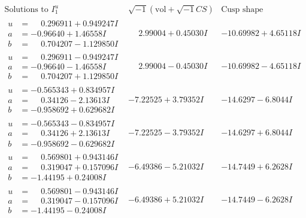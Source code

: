 \documentclass[1p]{elsarticle_modified}
\theoremstyle{definition}
\newcommand{\I}{\sqrt{-1}}
\begin{document}
$$\begin{array}{c|c|c}  
\text{Solutions to }I^u_{1}& \I (\text{vol} + \sqrt{-1}CS) & \text{Cusp shape}\\
 \hline 
\begin{aligned}
u &= \phantom{-}0.296911 + 0.949247 I \\
a &= -0.96640 + 1.46558 I \\
b &= \phantom{-}0.704207 - 1.129850 I\end{aligned}
 & \phantom{-}2.99004 + 0.45030 I & -10.69982 + 4.65118 I \\ \hline\begin{aligned}
u &= \phantom{-}0.296911 - 0.949247 I \\
a &= -0.96640 - 1.46558 I \\
b &= \phantom{-}0.704207 + 1.129850 I\end{aligned}
 & \phantom{-}2.99004 - 0.45030 I & -10.69982 - 4.65118 I \\ \hline\begin{aligned}
u &= -0.565343 + 0.834957 I \\
a &= \phantom{-}0.34126 - 2.13613 I \\
b &= -0.958692 + 0.629682 I\end{aligned}
 & -7.22525 + 3.79352 I & -14.6297 - 6.8044 I \\ \hline\begin{aligned}
u &= -0.565343 - 0.834957 I \\
a &= \phantom{-}0.34126 + 2.13613 I \\
b &= -0.958692 - 0.629682 I\end{aligned}
 & -7.22525 - 3.79352 I & -14.6297 + 6.8044 I \\ \hline\begin{aligned}
u &= \phantom{-}0.569801 + 0.943146 I \\
a &= \phantom{-}0.319047 + 0.157096 I \\
b &= -1.44195 + 0.24008 I\end{aligned}
 & -6.49386 - 5.21032 I & -14.7449 + 6.2628 I \\ \hline\begin{aligned}
u &= \phantom{-}0.569801 - 0.943146 I \\
a &= \phantom{-}0.319047 - 0.157096 I \\
b &= -1.44195 - 0.24008 I\end{aligned}
 & -6.49386 + 5.21032 I & -14.7449 - 6.2628 I \\ \hline\begin{aligned}

\end{aligned}
\end{array}$$
\end{document}
